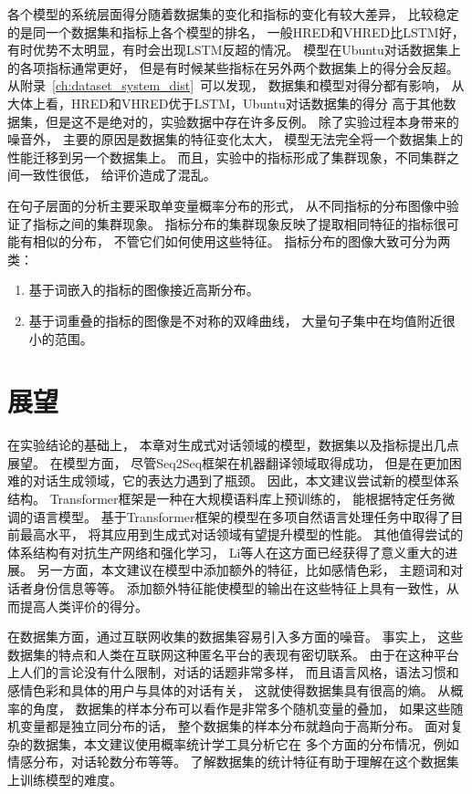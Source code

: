 各个模型的系统层面得分随着数据集的变化和指标的变化有较大差异，
比较稳定的是同一个数据集和指标上各个模型的排名，
一般HRED和VHRED比LSTM好，
有时优势不太明显，有时会出现LSTM反超的情况。
模型在Ubuntu对话数据集上的各项指标通常更好，
但是有时候某些指标在另外两个数据集上的得分会反超。
从附录~\ref{ch:dataset_system_dist}~可以发现，
数据集和模型对得分都有影响，
从大体上看，HRED和VHRED优于LSTM，Ubuntu对话数据集的得分
高于其他数据集，但是这不是绝对的，实验数据中存在许多反例。
除了实验过程本身带来的噪音外，
主要的原因是数据集的特征变化太大，
模型无法完全将一个数据集上的性能迁移到另一个数据集上。
而且，实验中的指标形成了集群现象，不同集群之间一致性很低，
给评价造成了混乱。

在句子层面的分析主要采取单变量概率分布的形式，
从不同指标的分布图像中验证了指标之间的集群现象。
指标分布的集群现象反映了提取相同特征的指标很可能有相似的分布，
不管它们如何使用这些特征。
指标分布的图像大致可分为两类：
\begin{enumerate}
    \item 基于词嵌入的指标的图像接近高斯分布。
    \item 基于词重叠的指标的图像是不对称的双峰曲线， 大量句子集中在均值附近很小的范围。
\end{enumerate}

\section*{展望}\label{sec:future_work}
在实验结论的基础上，
本章对生成式对话领域的模型，数据集以及指标提出几点展望。
在模型方面， 尽管Seq2Seq框架在机器翻译领域取得成功，
但是在更加困难的对话生成领域，它的表达力遇到了瓶颈。
因此，本文建议尝试新的模型体系结构。
Transformer框架是一种在大规模语料库上预训练的，
能根据特定任务微调的语言模型。
基于Transformer框架的模型在多项自然语言处理任务中取得了目前最高水平，
将其应用到生成式对话领域有望提升模型的性能。
其他值得尝试的体系结构有对抗生产网络和强化学习，
Li等人在这方面已经获得了意义重大的进展。
另一方面，本文建议在模型中添加额外的特征，比如感情色彩，
主题词和对话者身份信息等等。
添加额外特征能使模型的输出在这些特征上具有一致性，从而提高人类评价的得分。

在数据集方面，通过互联网收集的数据集容易引入多方面的噪音。
事实上，
这些数据集的特点和人类在互联网这种匿名平台的表现有密切联系。
由于在这种平台上人们的言论没有什么限制，对话的话题非常多样，
而且语言风格，语法习惯和感情色彩和具体的用户与具体的对话有关，
这就使得数据集具有很高的熵。
从概率的角度，
数据集的样本分布可以看作是非常多个随机变量的叠加，
如果这些随机变量都是独立同分布的话，
整个数据集的样本分布就趋向于高斯分布。
面对复杂的数据集，本文建议使用概率统计学工具分析它在
多个方面的分布情况，例如情感分布，对话轮数分布等等。
了解数据集的统计特征有助于理解在这个数据集上训练模型的难度。

